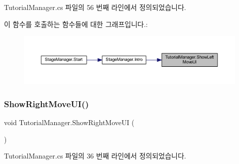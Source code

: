 Tutorial\+Manager.\+cs 파일의 56 번째 라인에서 정의되었습니다.


\begin{DoxyCode}{0}

\end{DoxyCode}
이 함수를 호출하는 함수들에 대한 그래프입니다.\+:\nopagebreak
\begin{figure}[H]
\begin{center}
\leavevmode
\includegraphics[width=350pt]{d6/d14/class_tutorial_manager_a852b4a32183004ef9513d7e43b99c247_icgraph}
\end{center}
\end{figure}
\mbox{\label{class_tutorial_manager_ab5c041496c132c994a47cb144cae521d}} 
\subsubsection{\texorpdfstring{ShowRightMoveUI()}{ShowRightMoveUI()}}
{\footnotesize\ttfamily void Tutorial\+Manager.\+Show\+Right\+Move\+UI (\begin{DoxyParamCaption}{ }\end{DoxyParamCaption})}



Tutorial\+Manager.\+cs 파일의 36 번째 라인에서 정의되었습니다.



